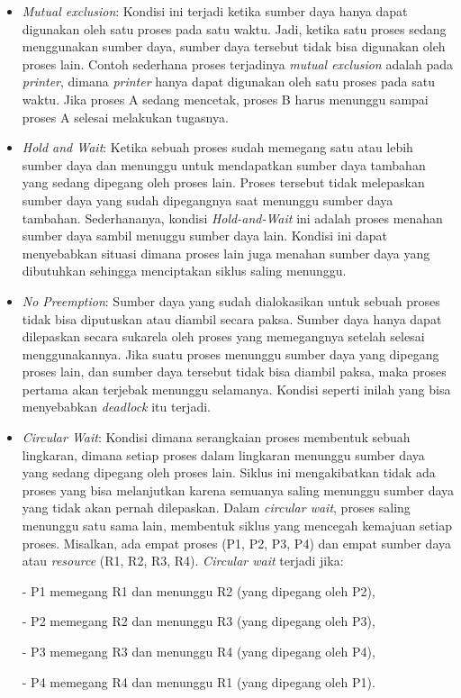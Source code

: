\documentclass[12pt]{article}
\begin{document}
\begin{itemize}
    \item \textit{Mutual exclusion}: Kondisi ini terjadi ketika sumber daya hanya dapat digunakan oleh satu proses pada satu waktu. Jadi, ketika satu proses sedang menggunakan sumber daya, sumber daya tersebut tidak bisa digunakan oleh proses lain. Contoh sederhana proses terjadinya \textit{mutual exclusion} adalah pada \textit{printer}, dimana \textit{printer} hanya dapat digunakan oleh satu proses pada satu waktu. Jika proses A sedang mencetak, proses B harus menunggu sampai proses A selesai melakukan tugasnya.
    
    \item \textit{Hold and Wait}: Ketika sebuah proses sudah memegang satu atau lebih sumber daya dan menunggu untuk mendapatkan sumber daya tambahan yang sedang dipegang oleh proses lain. Proses tersebut tidak melepaskan sumber daya yang sudah dipegangnya saat menunggu sumber daya tambahan. Sederhananya, kondisi \textit{Hold-and-Wait} ini adalah proses menahan sumber daya sambil menuggu sumber daya lain.  Kondisi ini dapat menyebabkan situasi dimana proses lain juga menahan sumber daya yang dibutuhkan sehingga menciptakan siklus saling menunggu.
    
    \item \textit{No Preemption}:  Sumber daya yang sudah dialokasikan untuk sebuah proses tidak bisa diputuskan atau diambil secara paksa. Sumber daya hanya dapat dilepaskan secara sukarela oleh proses yang memegangnya setelah selesai menggunakannya. Jika suatu proses menunggu sumber daya yang dipegang proses lain, dan sumber daya tersebut tidak bisa diambil paksa, maka proses pertama akan terjebak menunggu selamanya. Kondisi seperti inilah yang bisa menyebabkan \textit{deadlock} itu terjadi.
    
    \item \textit{Circular Wait}:  Kondisi dimana serangkaian proses membentuk sebuah lingkaran, dimana setiap proses dalam lingkaran menunggu sumber daya yang sedang dipegang oleh proses lain. Siklus ini mengakibatkan tidak ada proses yang bisa melanjutkan karena semuanya saling menunggu sumber daya yang tidak akan pernah dilepaskan.
    Dalam \textit{circular wait}, proses saling menunggu satu sama lain, membentuk siklus yang mencegah kemajuan setiap proses. Misalkan, ada empat proses (P1, P2, P3, P4) dan empat sumber daya atau \textit{resource} (R1, R2, R3, R4). \textit{Circular wait} terjadi jika:

    - P1 memegang R1 dan menunggu R2 (yang dipegang oleh P2),
    
    - P2 memegang R2 dan menunggu R3 (yang dipegang oleh P3),
    
    - P3 memegang R3 dan menunggu R4 (yang dipegang oleh P4),
    
    - P4 memegang R4 dan menunggu R1 (yang dipegang oleh P1).
\end{itemize}
\begin{enumerate}

\end{enumerate}
\end{document}

